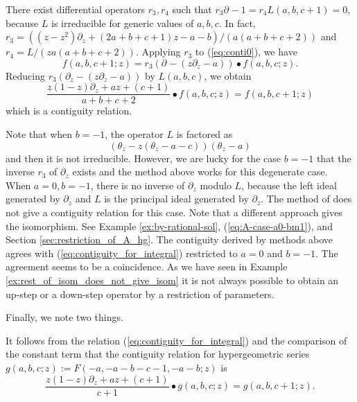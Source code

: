 \documentclass{article}
\def\pd#1{\partial_{#1}}
\begin{document}
There exist differential operators $r_3, r_4$ such that
$r_3 \pd{} - 1 = r_4 L(a,b,c+1)=0$,
because $L$ is irreducible for generic values of $a,b,c$.
In fact, 
$r_3 = ((z-z^2)\pd{z}+(2a+b+c+1) z-a-b)/(a (a+b+c+2))$
and 
$r_4=L/(z a (a+b+c+2))$.
Applying $r_3$ to (\ref{eq:conti0}), we have
$$
  f(a,b,c+1;z)= r_3 (\pd{}-(z \pd{z} - a)) \bullet f(a,b,c;z).
$$
Reducing $r_3 (\pd{z}-(z \pd{z}-a))$ by $L(a,b,c)$,
we obtain 
\begin{equation} \label{eq:contiguity_for_integral}
\frac{z (1-z) \pd{z}+a z+(c+1)}{a+b+c+2} \bullet f(a,b,c;z)=f(a,b,c+1;z)
\end{equation}
which is a contiguity relation.

Note that when $b=-1$, the operator $L$ is factored as
\begin{equation}
(\theta_z - z (\theta_z-a-c))(\theta_z-a)
\end{equation}
and then it is not irreducible.
However, we are lucky for the case $b=-1$ 
that the inverse $r_3$ of $\pd{z}$ exists
and the method above works for this degenerate case.
When $a=0, b=-1$, there is no inverse of $\pd{z}$ modulo $L$,
because the left ideal generated by $\pd{z}$ and $L$ is the principal
ideal generated by $\pd{z}$.
The method of \cite{oshima-2012} does not give a contiguity relation
for this case. 
Note that a different approach gives the isomorphism.  See Example \ref{ex:by-rational-sol}, (\ref{eq:A-case-a0-bm1}), and Section \ref{sec:restriction_of_A_hg}.
The contiguity derived by methods above agrees with (\ref{eq:contiguity_for_integral}) restricted to $a=0$ and $b=-1$. 
The agreement seems to be a coincidence.
As we have seen in Example \ref{ex:rest_of_isom_does_not_give_isom}
it is not always possible to obtain an up-step or a down-step operator by a restriction of parameters.



Finally, we note two things.

It follows from the relation (\ref{eq:contiguity_for_integral}) and the comparison of the constant term 
that the contiguity relation for hypergeometric series
$g(a,b,c;z):=F(-a,-a-b-c-1,-a-b;z)$ is
$$
\frac{z (1-z) \pd{z}+a z+(c+1)}{c+1} \bullet g(a,b,c;z)=g(a,b,c+1;z).
$$
\end{document}
